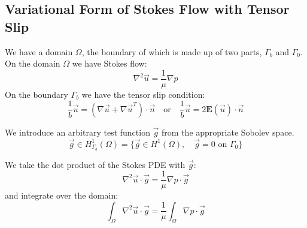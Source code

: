 \documentclass[a4paper]{report}
\begin{document}
\subsection*{Variational Form of Stokes Flow with Tensor Slip}

We have a domain $\Omega$, the boundary of which is made up of two parts, $\Gamma_b$ and $\Gamma_0$.  On the domain $\Omega$ we have Stokes flow:
\begin{equation}
\nabla^2 \vec{u} = \frac{1}{\mu} \nabla p
\end{equation}
On the boundary $\Gamma_b$ we have the tensor slip condition:
\begin{equation}
\frac{1}{b} \vec{u} = (\nabla \vec{u} + \nabla \vec{u}^T)\cdot \vec{n}
\quad \text{or} \quad
\frac{1}{b} \vec{u} = 2 \mathbf{E}(\vec{u}) \cdot \vec{n}
\end{equation}

\vspace{1em}
\begin{center}
\end{center}

We introduce an arbitrary test function $\vec{g}$ from the appropriate Sobolev space.
\begin{equation}
\vec{g} \in H^1_{\Gamma_b}(\Omega) = 
\{ \vec{g} \in H^1(\Omega), \quad \vec{g}=0 \text{ on } \Gamma_0 \}
\end{equation}

We take the dot product of the Stokes PDE with $\vec{g}$:
\begin{equation}
\nabla^2 \vec{u} \cdot \vec{g} = \frac{1}{\mu} \nabla p \cdot \vec{g}
\end{equation}
and integrate over the domain:
\begin{equation}
\int_{\Omega} \nabla^2 \vec{u} \cdot \vec{g} = 
\frac{1}{\mu} \int_{\Omega}  \nabla p \cdot \vec{g}
\end{equation}

\end{document}
